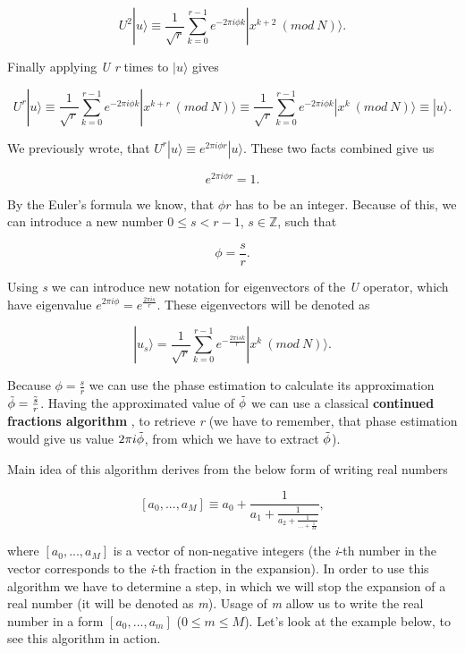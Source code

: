 \[ U^2|u\rangle \equiv \frac{1}{\sqrt{r}} \sum_{k = 0}^{r - 1} e^{-2 \pi i \phi k} |x^{k+2}\ (mod\ N)\rangle.\] 

Finally applying \textit{U} \textit{r} times to $|u\rangle$ gives

\[ U^r|u\rangle \equiv \frac{1}{\sqrt{r}} \sum_{k = 0}^{r - 1} e^{-2 \pi i \phi k} |x^{k+r}\ (mod\ N)\rangle \equiv \frac{1}{\sqrt{r}} \sum_{k = 0}^{r - 1} e^{-2 \pi i \phi k} |x^k\ (mod\ N)\rangle \equiv |u\rangle.\]

We previously wrote, that $U^r|u\rangle \equiv e^{2 \pi i \phi r}|u\rangle$. These two facts combined give us

\[ e^{2 \pi i \phi r} = 1.\]

By the Euler's formula we know, that $\phi r$ has to be an integer. Because of this, we can introduce a new number $0 \leq s < r - 1$, $s \in \mathbb{Z}$, such that

\[ \phi = \frac{s}{r}.\]

Using \textit{s} we can introduce new notation for eigenvectors of the \textit{U} operator, which have eigenvalue $e^{2 \pi i \phi} = e^{\frac{2 \pi i s}{r}}$. These eigenvectors will be denoted as

\[ |u_s\rangle = \frac{1}{\sqrt{r}} \sum_{k = 0}^{r - 1} e^{-\frac{2 \pi i s k}{r}} |x^k\ (mod\ N)\rangle.\]

Because $\phi = \frac{s}{r}$ we can use the phase estimation to calculate its approximation $\Tilde{\phi} = \Tilde{\frac{s}{r}}$. Having the approximated value of $\Tilde{\phi}$ we can use a classical \textbf{continued fractions algorithm} \cite{nielsen_chuang}, to retrieve \textit{r} (we have to remember, that phase estimation would give us value $2 \pi i \Tilde{\phi}$, from which we have to extract $\Tilde{\phi}$).

Main idea of this algorithm derives from the below form of writing real numbers

\[ [a_0, ..., a_M] \equiv a_0 + \frac{1}{a_1 + \frac{1}{a_2 + \frac{1}{... + \frac{1}{M}}}}, \]

where $[a_0, ..., a_M]$ is a vector of non-negative integers (the \textit{i}-th number in the vector corresponds to the \textit{i}-th fraction in the expansion). In order to use this algorithm we have to determine a step, in which we will stop the expansion of a real number (it will be denoted as \textit{m}). Usage of \textit{m} allow us to write the real number in a form $[a_0, ..., a_m]$ ($0 \leq m \leq M$). Let's look at the example below, to see this algorithm in action.

